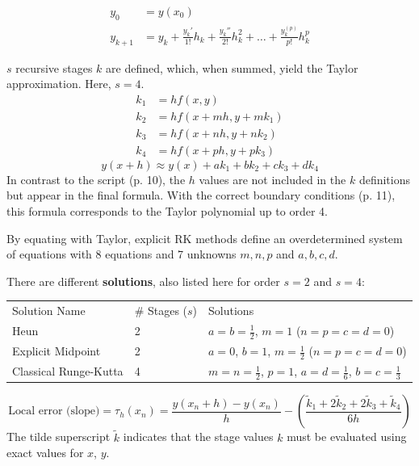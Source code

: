   \begin{align*}
      y_0 &= y(x_0) \\
      y_{k+1} &= y_k + \frac{y_k'}{1!}h_k + \frac{y_k''}{2!} h_k^2 + \ldots + \frac{y_k^{(p)}}{p!} h_k^p
  \end{align*}

\newpage
    $s$ recursive stages $k$ are defined, which, when summed, yield the Taylor approximation. Here, $s=4$.
    \begin{align*}
        k_1 &= hf(x,y)\\
        k_2 &= hf(x + m h, y+m k_1)\\
        k_3 &= hf(x + n h, y+n  k_2)\\
        k_4 &= hf(x + p h, y+p k_3)
    \end{align*}
    $$y(x+h) \approx y(x) + a k_1 + b k_2 + c k_3 + d k_4 $$
    In contrast to the script (p. 10), the $h$ values are not included in the $k$ definitions but appear in the final formula. With the correct boundary conditions (p. 11), this formula corresponds to the Taylor polynomial up to order 4.

    By equating with Taylor, explicit RK methods define an overdetermined system of equations with 8 equations and 7 unknowns $m,n,p$ and $a,b,c,d$.

    There are different \textbf{solutions}, also listed here for order $s=2$ and $s=4$:
    \begin{tabular}{lll}
        Solution Name & \# Stages ($s$) & Solutions\\
        Heun & 2 & $a=b=\frac12$, $m=1$ ($n=p=c=d=0$)\\
        Explicit Midpoint & 2 & $a=0$, $b=1$, $m=\frac12$ ($n=p=c=d=0$)\\
        Classical Runge-Kutta & 4 & $m=n=\frac12$, $p=1$, $a=d=\frac16$, $b=c=\frac13$
    \end{tabular}

    $$
    \text{Local error (slope)} = \tau_h(x_n) = \frac{y(x_n +h)- y(x_n)}{h} - \left( \frac{\tilde k_1 + 2\tilde k_2 +2 \tilde k_3 + \tilde k_4}{6h} \right)
    $$
    The tilde superscript $\tilde k$ indicates that the stage values $k$ must be evaluated using exact values for $x$, $y$.

